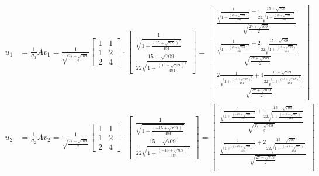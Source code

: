 \documentclass[a4paper, spanish]{article}
\begin{document}
  \begin{align}
    u_1 &=
    \frac{1}{\sigma_1}Av_1 =
    \frac{1}{\sqrt{\frac{27 + \sqrt{709}}{2}}}
    \begin{bmatrix}
      1 & 1\\
      1 & 2\\
      2 & 4
    \end{bmatrix}
    \cdot
    \begin{bmatrix}
      \frac{1}{\sqrt{1 + \frac{(15 + \sqrt{709})^2}{484}}} \\
      \frac{15 + \sqrt{709}}{22\sqrt{1 + \frac{(15 + \sqrt{709})^2}{484}}}
    \end{bmatrix}
    =
    \begin{bmatrix}
        \frac{\frac{1}{\sqrt{1 + \frac{(15 + \sqrt{709})^2}{484}}} +
        \frac{15 + \sqrt{709}}{22\sqrt{1 + \frac{(15 + \sqrt{709})^2}{484}}}}{\sqrt{\frac{27 + \sqrt{709}}{2}}} \\
        \frac{\frac{1}{\sqrt{1 + \frac{(15 + \sqrt{709})^2}{484}}} +2
        \frac{15 + \sqrt{709}}{22\sqrt{1 + \frac{(15 + \sqrt{709})^2}{484}}}}{\sqrt{\frac{27 + \sqrt{709}}{2}}} \\
        \frac{2\frac{1}{\sqrt{1 + \frac{(15 + \sqrt{709})^2}{484}}} +4
        \frac{15 + \sqrt{709}}{22\sqrt{1 + \frac{(15 + \sqrt{709})^2}{484}}}}{\sqrt{\frac{27 + \sqrt{709}}{2}}}
    \end{bmatrix} \\
    u_2 &=
    \frac{1}{\sigma_2}Av_2 =
    \frac{1}{\sqrt{\frac{27 - \sqrt{709}}{2}}}
    \begin{bmatrix}
      1 & 1\\
      1 & 2\\
      2 & 4
    \end{bmatrix}
    \cdot
    \begin{bmatrix}
      \frac{1}{\sqrt{1 + \frac{(- 15 + \sqrt{709})^2}{484}}} \\
      \frac{15 - \sqrt{709}}{22\sqrt{1 + \frac{(- 15 + \sqrt{709})^2}{484}}}
    \end{bmatrix}
    =
    \begin{bmatrix}
      \frac{\frac{1}{\sqrt{1 + \frac{(- 15 + \sqrt{709})^2}{484}}} + \frac{15 - \sqrt{709}}{22\sqrt{1 + \frac{(- 15 + \sqrt{709})^2}{484}}}}{\sqrt{\frac{27 - \sqrt{709}}{2}}} \\
      \frac{\frac{1}{\sqrt{1 + \frac{(- 15 + \sqrt{709})^2}{484}}} + 2
      \frac{15 - \sqrt{709}}{22\sqrt{1 + \frac{(- 15 + \sqrt{709})^2}{484}}}}{\sqrt{\frac{27 - \sqrt{709}}{2}}} \\

\end{bmatrix}
\end{align}
\end{document}

